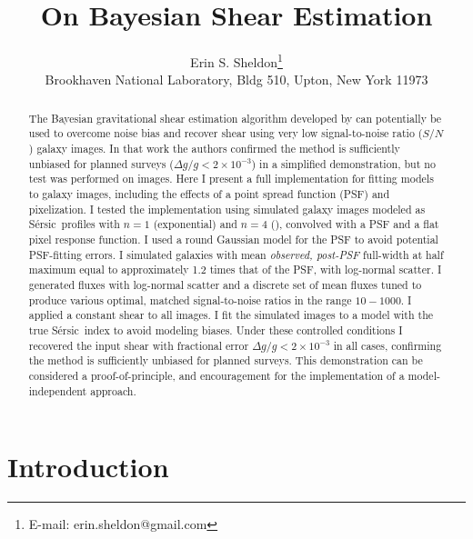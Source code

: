 \documentclass[usegraphicx,usenatbib]{mn2e}
\newcommand{\sn}{$S/N$}
\newcommand{\sersic}{S\'{e}rsic}
\begin{document}
\title{On Bayesian Shear Estimation}

\author[Erin S. Sheldon]{Erin S. Sheldon\thanks{E-mail: erin.sheldon@gmail.com}\\
Brookhaven National Laboratory, Bldg 510, Upton, New York 11973}

\maketitle

\begin{abstract}

The Bayesian gravitational shear estimation algorithm developed by \cite{ba14}
can potentially be used to overcome noise bias and recover shear using very low
signal-to-noise ratio (\sn) galaxy images.  In that work the authors confirmed
the method is sufficiently unbiased for planned surveys ($\Delta g/g < 2 \times
10^{-3}$) in a simplified demonstration, but no test was performed on images.
Here I present a full implementation for fitting models to galaxy images,
including the effects of a point spread function (PSF) and pixelization.  I
tested the implementation using simulated galaxy images modeled as \sersic\
profiles with $n=1$ (exponential) and $n=4$ (\devauc), convolved with a PSF and
a flat pixel response function.  I used a round Gaussian model for the PSF to
avoid potential PSF-fitting errors. I simulated galaxies with mean {\it
observed, post-PSF} full-width at half maximum equal to approximately 1.2 times
that of the PSF, with log-normal scatter.  I generated fluxes with
log-normal scatter and a discrete set of mean fluxes tuned to produce various
optimal, matched signal-to-noise ratios in the range $10-1000$.  I applied a
constant shear to all images. I fit the simulated images to a model with the
true \sersic\ index to avoid modeling biases.   Under these controlled
conditions I recovered the input shear with fractional error $\Delta g/g < 2
\times 10^{-3}$ in all cases, confirming the method is sufficiently unbiased
for planned surveys.  This demonstration can be considered a
proof-of-principle, and encouragement for the implementation of a
model-independent approach.


\end{abstract}

\section{Introduction} \label{sec:intro}
\end{document}
